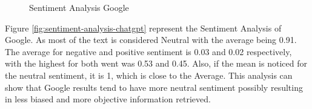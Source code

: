 \documentclass[50pt]{usiinfbachelorproject}
\begin{document}
\begin{figure}[H]
  \centering
  \hfill
  \hfill
  \caption{Sentiment Analysis Google}
  \label{fig:sentiment-analysis-google}
\end{figure}

Figure \ref{fig:sentiment-analysis-chatgpt} represent the Sentiment Analysis of Google. As most of the text is considered Neutral with the average being 0.91. The average for negative and positive sentiment is 0.03 and 0.02 respectively, with the highest for both went was 0.53 and 0.45. Also, if the mean is noticed for the neutral sentiment, it is 1, which is close to the Average. This analysis can show that Google results tend to have more neutral sentiment possibly resulting in less biased and more objective information retrieved.
\end{document}
